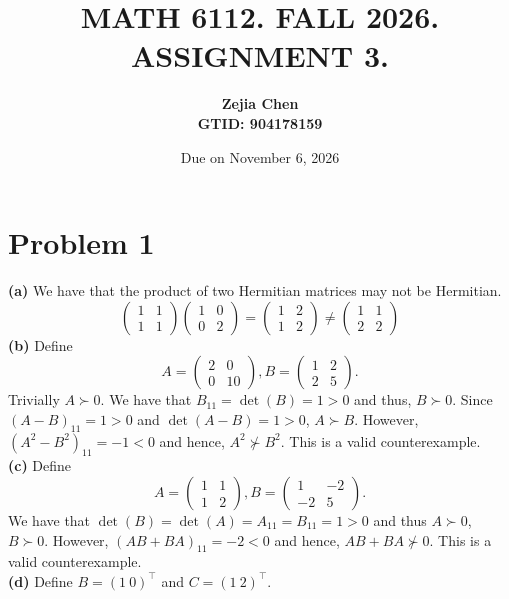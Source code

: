 \documentclass[11pt]{article}
\title{MATH 6112. FALL 2026. ASSIGNMENT 3.}
\date{Due on November 6, 2026}
\author{{\textbf{Zejia Chen}} \\ \textbf{GTID: 904178159}}
\theoremstyle{plain}
\theoremstyle{definition}
\theoremstyle{remark}
\def\-#1{\mathrm{#1}} %
\begin{document}
\maketitle
\section*{Problem 1}
\textbf{(a)} We have that the product of two Hermitian matrices may not be Hermitian.
$$
    \begin{pmatrix}
        1 & 1
        \\1 & 1
    \end{pmatrix}\begin{pmatrix}
        1 & 0
        \\0 & 2
    \end{pmatrix}
    = \begin{pmatrix}
        1 & 2
        \\1 & 2
    \end{pmatrix} \neq \begin{pmatrix}
        1 & 1
        \\2 & 2
    \end{pmatrix}
$$
\textbf{(b)}
Define 
$$
    A = \begin{pmatrix}
        2 & 0
        \\0 & 10
    \end{pmatrix}, 
    B = \begin{pmatrix}
        1 & 2
        \\2 & 5
    \end{pmatrix}.
$$
Trivially $A\succ 0$.
We have that $B_{11} = \det(B) = 1 > 0$ and thus, $B\succ 0$.
Since $(A-B)_{11} = 1 > 0$ and $\det(A-B) = 1 > 0$, $A\succ B$.
However, $(A^2 - B^2)_{11} = -1 < 0$ and hence, $A^2 \nsucc B^2$.
This is a valid counterexample.
\\\textbf{(c)}
Define 
$$
    A = \begin{pmatrix}
        1 & 1
        \\1 & 2
    \end{pmatrix}, 
    B = \begin{pmatrix}
        1 & -2
        \\-2 & 5
    \end{pmatrix}.
$$
We have that $\det(B) = \det(A) = A_{11} = B_{11} = 1 > 0$ and thus $A\succ 0$, $B\succ 0$.
However, $(AB + BA)_{11} = -2 < 0$ and hence, $AB+BA \nsucc 0$.
This is a valid counterexample.
\\\textbf{(d)}
Define $B = (1\ 0)^\top$ and $C = (1\ 2)^\top$.
\end{document}

